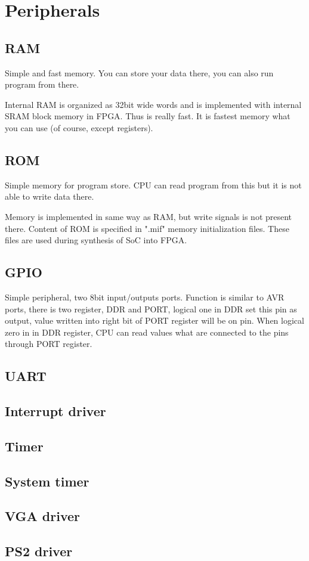 \section{Peripherals}

\subsection{RAM}

Simple and fast memory. You can store your data there, you can also run program
from there.

Internal RAM is organized as 32bit wide words and is implemented with internal
SRAM block memory in FPGA. Thus is really fast. It is fastest memory what you
can use (of course, except registers).

\subsection{ROM}

Simple memory for program store. CPU can read program from this but it is not
able to write data there.

Memory is implemented in same way as RAM, but write signals is not present
there. Content of ROM is specified in ".mif" memory initialization files. These
files are used during synthesis of SoC into FPGA.

\subsection{GPIO}
Simple peripheral, two 8bit input/outputs ports. Function is similar
to AVR ports, there is two register, DDR and PORT, logical one in DDR
set this pin as output, value written into right bit of PORT register
will be on pin. When logical zero in in DDR register, CPU can read
values what are connected to the pins through PORT register.

\subsection{UART}

\subsection{Interrupt driver}

\subsection{Timer}

\subsection{System timer}

\subsection{VGA driver}

\subsection{PS2 driver}
